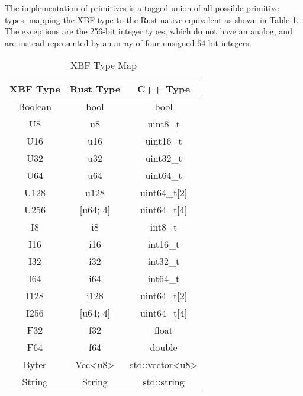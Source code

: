 \documentclass[conference]{IEEEtran}
\begin{document}
The implementation of primitives is a tagged union of all possible primitive types, mapping the XBF type to the Rust native equivalent as shown in Table \ref{type_map}. The exceptions are the 256-bit integer types, which do not have an analog, and are instead represented by an array of four unsigned 64-bit integers.

\begin{table}[htbp]
	\caption{XBF Type Map}\label{type_map}
	\begin{center}
		\begin{tabular}{|c|c|c|}
			\hline
			\textbf{XBF Type} & \textbf{Rust Type}          & \textbf{C++ Type}                   \\
			\hline
			Boolean           & bool                        & bool                                \\
			U8                & u8                          & uint8\_t                            \\
			U16               & u16                         & uint16\_t                           \\
			U32               & u32                         & uint32\_t                           \\
			U64               & u64                         & uint64\_t                           \\
			U128              & u128                        & uint64\_t[2]                        \\
			U256              & [u64; 4]                    & uint64\_t[4]                        \\
			I8                & i8                          & int8\_t                             \\
			I16               & i16                         & int16\_t                            \\
			I32               & i32                         & int32\_t                            \\
			I64               & i64                         & int64\_t                            \\
			I128              & i128                        & uint64\_t[2]                        \\
			I256              & [u64; 4]                    & uint64\_t[4]                        \\
			F32               & f32                         & float                               \\
			F64               & f64                         & double                              \\
			Bytes             & Vec\textless u8\textgreater & std::vector\textless u8\textgreater \\
			String            & String                      & std::string                         \\
			\hline
		\end{tabular}
	\end{center}
\end{table}
\end{document}
